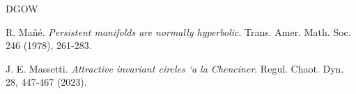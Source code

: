 \documentclass{amsart}
\begin{document}
\begin{thebibliography}{DGOW}
			
			
			
			
			
			
			 R. Ma\~{n}\'{e}. {\it Persistent manifolds are normally hyperbolic}. Trans. Amer. Math. Soc. 246 (1978), 261-283.
			
			 J. E. Massetti. {\it Attractive invariant circles `a la Chenciner}. Regul. Chaot. Dyn. 28, 447-467 (2023).
			
			
			
			

\end{thebibliography}
\end{document}
